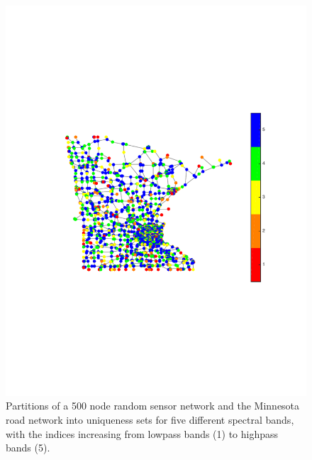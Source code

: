 \documentclass[journal, 10pt]{IEEEtran}
\begin{document}
\begin{figure}[t]
\begin{minipage}[m]{0.05\linewidth}
\end{minipage}
\hspace{.003\linewidth}
\begin{minipage}[m]{0.46\linewidth}
\centerline{\includegraphics[width=.9\linewidth]{fig_uniq_part_minn4}}
\end{minipage}
\caption{Partitions of a 500 node random sensor network and the Minnesota road network \cite{gleich} into uniqueness sets for five different spectral bands, with the indices increasing from lowpass bands (1) to highpass bands (5).} \label{Fig:part_examples}
\end{figure} 
\end{document}
